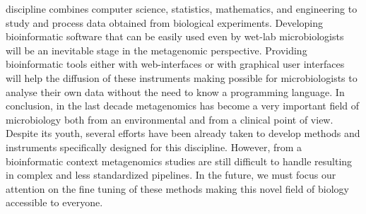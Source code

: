 discipline combines computer science, statistics, mathematics, and engineering to study and process data obtained from biological experiments. Developing bioinformatic software that can be easily used even by wet-lab microbiologists will be an inevitable stage in the metagenomic perspective. Providing bioinformatic tools either with web-interfaces or with graphical user interfaces will help the diffusion of these instruments making possible for microbiologists to analyse their own data without the need to know a programming language. In conclusion, in the last decade metagenomics has become a very important field of microbiology both from an environmental and from a clinical point of view. Despite its youth, several efforts have been already taken to develop methods and instruments specifically designed for this discipline. However, from a bioinformatic context metagenomics studies are still difficult to handle resulting in complex and less standardized pipelines. In the future, we must focus our attention on the fine tuning of these methods making this novel field of biology accessible to everyone.\\
